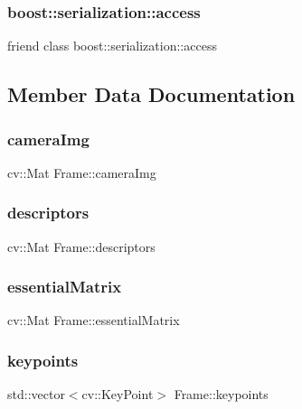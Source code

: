 \subsubsection{\texorpdfstring{boost\+::serialization\+::access}{boost::serialization::access}}
{\footnotesize\ttfamily friend class boost\+::serialization\+::access\hspace{0.3cm}{\ttfamily [friend]}}



\subsection{Member Data Documentation}
\mbox{\label{classFrame_af327ba7e56d6e4cd8f2917d36284ca4c}} 
\subsubsection{\texorpdfstring{camera\+Img}{cameraImg}}
{\footnotesize\ttfamily cv\+::\+Mat Frame\+::camera\+Img}

\mbox{\label{classFrame_a358eda120b8420754f30f69007e9fecb}} 
\subsubsection{\texorpdfstring{descriptors}{descriptors}}
{\footnotesize\ttfamily cv\+::\+Mat Frame\+::descriptors}

\mbox{\label{classFrame_a07cc311d7b6e3dd5b964a4ea42a003b3}} 
\subsubsection{\texorpdfstring{essential\+Matrix}{essentialMatrix}}
{\footnotesize\ttfamily cv\+::\+Mat Frame\+::essential\+Matrix}

\mbox{\label{classFrame_aec3f6874598eadb1e014709b28e48061}} 
\subsubsection{\texorpdfstring{keypoints}{keypoints}}
{\footnotesize\ttfamily std\+::vector$<$cv\+::\+Key\+Point$>$ Frame\+::keypoints}

